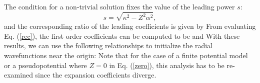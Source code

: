 \documentclass[11pt]{article}
\begin{document}
The condition for a non-trivial solution fixes the value of the
leading power $s$:
\begin{equation}
s= \sqrt{\kappa^2-Z^2 \alpha^2},
\end{equation}
and the corresponding ratio of the leading coefficients is given
by 
From evaluating Eq. (\ref{rec}), the first order coefficients can
be computed to be
and
With these results, we can use the following relationships to initialize
the radial wavefunctions near the origin:
Note that for the case of a finite potential model or a pseudopotential
where  $Z=0$ in Eq. (\ref{zero}), this analysis has to be re-examined since
the expansion coefficients diverge.
\end{document}
